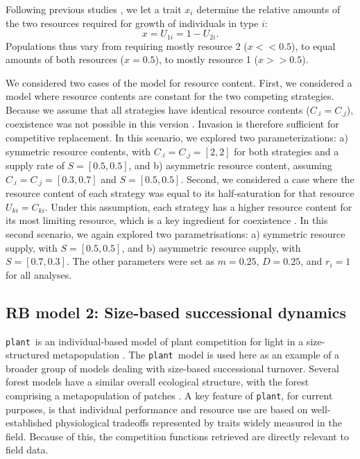 \documentclass[a4paper,11pt]{article}
\newcommand{\plant}{{\tt plant}}
\begin{document}
Following previous studies \citep{Tilman-1985, Schreiber-2003, Fox-2008}, we let a trait $x_i$ determine the relative amounts of the two resources required for growth of individuals in type $i$: \begin{equation}
\label{eq:R3}
x = U_{1i} = 1 - U_{2i}.
\end{equation}
Populations thus vary from requiring mostly resource 2 ($x << 0.5$), to equal amounts of both resources ($x = 0.5$), to mostly resource 1 ($x >> 0.5$).

We considered two cases of the model for resource content. First, we considered a model where resource contents are constant for the two competing strategies. Because we assume that all strategies have identical resource contents ($C_{.i} = C_{.j}$), coexistence was not possible in this version \citep{Tilman-1982}. Invasion is therefore sufficient for competitive replacement. In this scenario, we explored two parameterizations: a) symmetric resource contents, with $C_{.i} = C_{.j} = [2,2]$ for both strategies and a supply rate of $S = [0.5, 0.5]$, and b) asymmetric resource content, assuming $C_{.i} = C_{.j} = [0.3,0.7]$ and $S = [0.5, 0.5]$. Second, we considered a case where the resource content of each strategy was equal to its half-saturation for that resource $U_{ki} = C_{ki}$. Under this assumption, each strategy has a higher resource content for its most limiting resource, which is a key ingredient for coexistence \citep{Tilman-1982}. In this second scenario, we again explored two parametrisations: a) symmetric resource supply, with $S = [0.5, 0.5]$, and b) asymmetric resource supply, with $S = [0.7, 0.3]$. The other parameters were set as $m = 0.25$, $D=0.25$, and $r_i = 1$ for all analyses. 

\subsection{RB model 2: Size-based successional dynamics}

\plant\ is an individual-based model of plant competition for light in a size-structured metapopulation \citep{Falster-2016, Falster-2017}. The \plant\ model is used here as an example of a broader group of models dealing with size-based successional turnover. Several forest models have a similar overall ecological structure, with the forest comprising a metapopulation of patches \citep{Huston-1987,Kohyama-1993,Moorcroft-2001, Medvigy-2012, Smith-2014}. A key feature of \plant, for current purposes, is that individual performance and resource use are based on well-established physiological tradeoffs represented by traits widely measured in the field. Because of this, the competition functions retrieved are directly relevant to field data.
\end{document}
